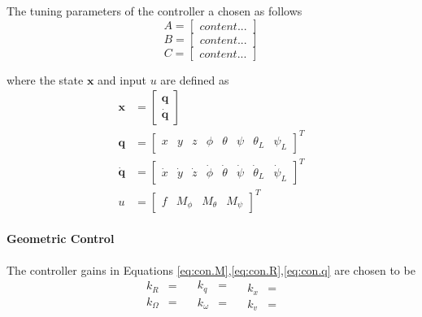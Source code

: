The tuning parameters of the  controller a chosen as follows
\begin{equation}\label{key}
A=\begin{bmatrix}
content...
\end{bmatrix}
\end{equation}
\begin{equation}\label{key}
B=\begin{bmatrix}
content...
\end{bmatrix}
\end{equation}
\begin{equation}\label{key}
C=\begin{bmatrix}
content...
\end{bmatrix}
\end{equation}

where the state $ \mathbf{x} $ and input $ u $ are defined as 
\begin{align}\label{eq:state}
\textbf{x}&=\begin{bmatrix}
\textbf{q}\\
\mathbf{\dot{q}}
\end{bmatrix}\\
\mathbf{q}&=\begin{bmatrix}
x&y&z&\phi&\theta&\psi&\theta_L&\psi_L
\end{bmatrix}^T\\
\mathbf{\dot{q}}&=\begin{bmatrix}
\dot{x}&\dot{y}&\dot{z}&\dot{\phi}&\dot{\theta}&\dot{\psi}&\dot{\theta}_L&\dot{\psi}_L
\end{bmatrix}^T\\
u&=\begin{bmatrix}
f&M_\phi&M_\theta&M_\psi
\end{bmatrix}^T
\end{align}

\paragraph{Geometric Control}
The controller gains in Equations \ref{eq:con.M},\ref{eq:con.R},\ref{eq:con.q} are chosen to be
\begin{equation}\label{key}
\begin{aligned}
k_R&=\\
k_\Omega&=\\
\end{aligned}
\quad
\begin{aligned}
k_q&=\\
k_\omega&=\\
\end{aligned}
\quad
\begin{aligned}
k_x&=\\
k_v&=
\nonumber
\end{aligned}
\end{equation}


